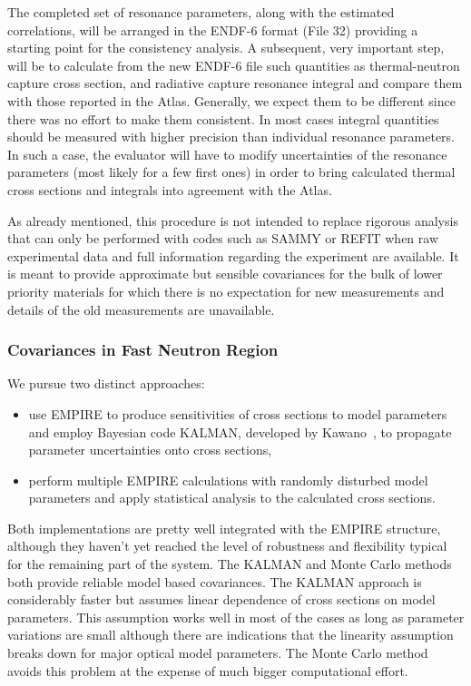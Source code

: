 \documentclass[twocolumn,amsmath,amssymb,10pt,groupedaddress,a4paper]{revtex4}
\begin{document}
The completed set of resonance parameters, along with the estimated correlations, will be arranged in the ENDF-6 format (File 32) providing a starting point for the consistency analysis. A subsequent, very important step, will be to calculate from the new ENDF-6 file such quantities as thermal-neutron capture cross section, and radiative capture resonance integral and compare them with those reported in the Atlas. Generally, we expect them to be different since there was no effort to make them consistent. In most cases integral quantities should be measured with higher precision than individual resonance parameters. In such a case, the evaluator will have to modify uncertainties of the resonance parameters (most likely for a few first ones) in order to bring calculated thermal cross sections and integrals into agreement with the Atlas.

As already mentioned, this procedure is not intended to replace rigorous analysis that can only be performed with codes such as SAMMY or REFIT when raw experimental data and full information regarding the experiment are available. It is meant to provide approximate but sensible covariances for the bulk of lower priority materials for which there is no expectation for new measurements and details of the old measurements are unavailable.



\subsubsection{Covariances in Fast Neutron Region}
We pursue two distinct approaches:
\begin{itemize}
\item use EMPIRE to produce sensitivities of cross sections to model parameters and employ Bayesian code KALMAN, developed by Kawano~\cite{Kawano:97}, to propagate parameter uncertainties onto cross sections,
\item perform multiple EMPIRE calculations with randomly disturbed model parameters and apply statistical analysis to the calculated cross sections.
\end{itemize}

Both implementations are pretty well integrated with the EMPIRE structure, although they haven't yet reached the level of robustness and flexibility typical for the remaining part of the system. The KALMAN and Monte Carlo methods both provide reliable model based covariances. The KALMAN approach is considerably faster but assumes linear dependence of cross sections on model parameters. This assumption works well in most of the cases as long as parameter variations are small although there are indications that the linearity assumption breaks down for major optical model parameters.  The Monte Carlo method avoids this problem at the expense of much bigger computational effort.
\end{document}
